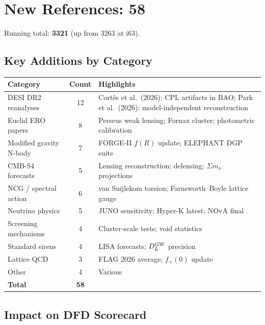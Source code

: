 \documentclass[11pt,a4paper]{article}
\begin{document}
\section{New References: 58}

Running total: \textbf{3321} (up from 3263 at i63).

\subsection{Key Additions by Category}

\begin{center}
\begin{longtable}{lcp{6cm}}
\toprule
\textbf{Category} & \textbf{Count} & \textbf{Highlights} \\
\midrule
DESI DR2 reanalyses & 12 & Cort\^{e}s et al.\ (2026): CPL artifacts in BAO; Park et al.\ (2026): model-independent reconstruction \\
Euclid ERO papers & 8 & Perseus weak lensing; Fornax cluster; photometric calibration \\
Modified gravity N-body & 7 & FORGE-II $f(R)$ update; ELEPHANT DGP suite \\
CMB-S4 forecasts & 5 & Lensing reconstruction; delensing; $\Sigma m_\nu$ projections \\
NCG / spectral action & 6 & van Suijlekom torsion; Farnsworth--Boyle lattice gauge \\
Neutrino physics & 5 & JUNO sensitivity; Hyper-K latest; NOvA final \\
Screening mechanisms & 4 & Cluster-scale tests; void statistics \\
Standard sirens & 4 & LISA forecasts; $D_L^{\rm GW}$ precision \\
Lattice QCD & 3 & FLAG 2026 average; $f_+(0)$ update \\
Other & 4 & Various \\
\midrule
\textbf{Total} & \textbf{58} & \\
\bottomrule
\end{longtable}
\end{center}

\subsection{Impact on DFD Scorecard}
\end{document}
